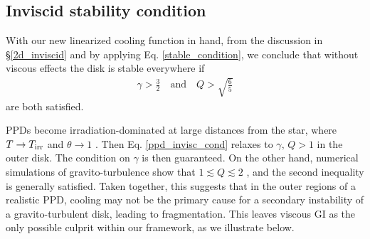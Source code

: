 
\subsection{Inviscid stability condition}
With our new linearized cooling function in hand, from the discussion
in \S\ref{2d_inviscid} and by applying 
Eq. \ref{stable_condition},  we conclude that without viscous effects 
the disk is stable everywhere if  
\begin{align} 
  \gamma > \frac{3}{2} \quad \text{and} \quad Q >
  \sqrt{\frac{6}{5}} \label{ppd_invisc_cond} 
\end{align} 
are both satisfied.  

PPDs become irradiation-dominated at large distances from the star,
where $T\to T_\mathrm{irr}$ and $\theta\to 1$ {\bf \citep{chiang97,dalessio97,kratter11}}.
Then Eq. \ref{ppd_invisc_cond} relaxes to 
$\gamma,\, Q > 1$ in the outer disk. The condition on $\gamma$
is then guaranteed. On the other hand, numerical 
simulations of gravito-turbulence show that $1\lesssim Q \lesssim 2$
\citep{gammie01,rice11}, and the second inequality is generally
satisfied.   
Taken together, this suggests that in the outer regions of a realistic
PPD, cooling %
may not be the primary cause for a secondary 
instability of a gravito-turbulent disk, leading to
fragmentation. This leaves viscous GI as the only possible culprit
within our framework, as we illustrate below.  

